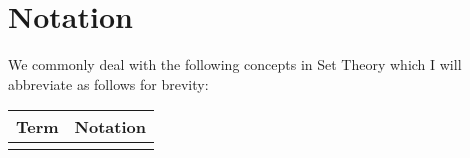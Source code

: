 \section{Notation}

We commonly deal with the following concepts in Set Theory
which I will abbreviate as follows for brevity:
\begin{center}
    \begin{tabular}{ | r | c | }
        \hline
        Term & Notation \\
        \hline \hline
        & \\
        \hline
    \end{tabular}
\end{center}